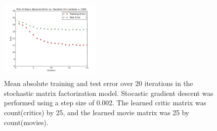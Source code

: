 \documentclass[10.5pt]{article}
\newcommand{\factwidth}{0.44}
\newcommand{\factheight}{1.6in}
\begin{document}
\begin{figure}[H]
\includegraphics[width=0\factwidth\textwidth,height=\factheight]{matrix_plots/test-i40d25l1000.png}
\caption{Mean absolute training and test error over 20 iterations in the stochastic matrix factorization model. Stocastic gradient descent was performed using a step size of 0.002. The learned critic matrix was count(critics) by 25, and the learned movie matrix was 25 by count(movies).}
\label{fig:fac-d25}
\end{figure}
\end{document}

